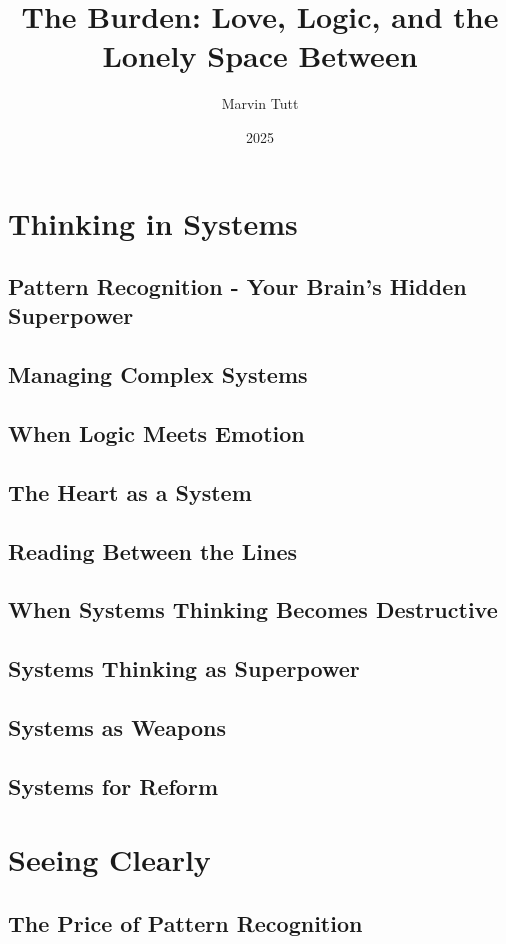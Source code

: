\documentclass[12pt]{book}
\title{The Burden: Love, Logic, and the Lonely Space Between}
\author{Marvin Tutt}
\date{2025}
\begin{document}
\maketitle
\tableofcontents

\part{Thinking in Systems}
\chapter{Pattern Recognition - Your Brain's Hidden Superpower}
\chapter{Managing Complex Systems}
\chapter{When Logic Meets Emotion}
\chapter{The Heart as a System}
\chapter{Reading Between the Lines}
\chapter{When Systems Thinking Becomes Destructive}
\chapter{Systems Thinking as Superpower}
\chapter{Systems as Weapons}
\chapter{Systems for Reform}

\part{Seeing Clearly}
\chapter{The Price of Pattern Recognition}
\end{document}
